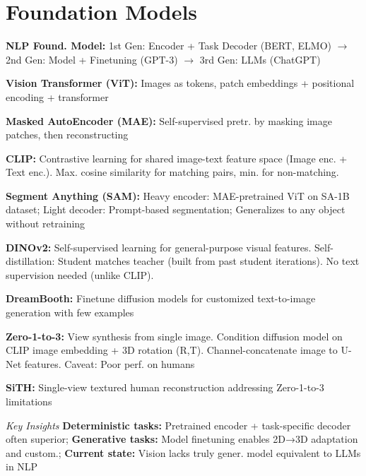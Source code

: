 \section{Foundation Models}

\textbf{NLP Found. Model:}
1st Gen: Encoder + Task Decoder (BERT, ELMO) $\to$ 2nd Gen: Model + Finetuning (GPT-3) $\to$ 3rd Gen: LLMs (ChatGPT)

\textbf{Vision Transformer (ViT):} Images as tokens, patch embeddings + positional encoding + transformer

\textbf{Masked AutoEncoder (MAE):} Self-supervised pretr. by masking image patches, then reconstructing

\textbf{CLIP:} Contrastive learning for shared image-text feature space (Image enc. + Text enc.). Max. cosine similarity for matching pairs, min. for non-matching. 

\textbf{Segment Anything (SAM):} Heavy encoder: MAE-pretrained ViT on SA-1B dataset; Light decoder: Prompt-based segmentation; Generalizes to any object without retraining

\textbf{DINOv2:} Self-supervised learning for general-purpose visual features. Self-distillation: Student matches teacher (built from past student iterations). No text supervision needed (unlike CLIP).

\textbf{DreamBooth:} Finetune diffusion models for customized text-to-image generation with few examples

\textbf{Zero-1-to-3:} View synthesis from single image. Condition diffusion model on CLIP image embedding + 3D rotation (R,T). Channel-concatenate image to U-Net features. Caveat: Poor perf. on humans

\textbf{SiTH:} Single-view textured human reconstruction addressing Zero-1-to-3 limitations

\emph{Key Insights} \textbf{Deterministic tasks:} Pretrained encoder + task-specific decoder often superior; \textbf{Generative tasks:} Model finetuning enables 2D→3D adaptation and custom.; \textbf{Current state:} Vision lacks truly gener. model equivalent to LLMs in NLP